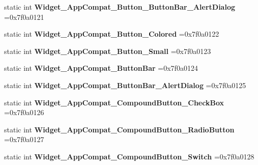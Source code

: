 \begin{DoxyCompactItemize}
static int {\bfseries Widget\+\_\+\+App\+Compat\+\_\+\+Button\+\_\+\+Button\+Bar\+\_\+\+Alert\+Dialog} =0x7f0a0121
\item 
\mbox{\label{classandroid_1_1support_1_1v7_1_1mediarouter_1_1R_1_1style_a526e5e9cd743dd54fc52c55bef9ba08b}} 
static int {\bfseries Widget\+\_\+\+App\+Compat\+\_\+\+Button\+\_\+\+Colored} =0x7f0a0122
\item 
\mbox{\label{classandroid_1_1support_1_1v7_1_1mediarouter_1_1R_1_1style_a2b6f6f9619f0bad1ce7cafd6d342f372}} 
static int {\bfseries Widget\+\_\+\+App\+Compat\+\_\+\+Button\+\_\+\+Small} =0x7f0a0123
\item 
\mbox{\label{classandroid_1_1support_1_1v7_1_1mediarouter_1_1R_1_1style_aa8c7c51e91608a7bd7e1ee62da226377}} 
static int {\bfseries Widget\+\_\+\+App\+Compat\+\_\+\+Button\+Bar} =0x7f0a0124
\item 
\mbox{\label{classandroid_1_1support_1_1v7_1_1mediarouter_1_1R_1_1style_a7a4b1e24713ee3e430383b3537585d3b}} 
static int {\bfseries Widget\+\_\+\+App\+Compat\+\_\+\+Button\+Bar\+\_\+\+Alert\+Dialog} =0x7f0a0125
\item 
\mbox{\label{classandroid_1_1support_1_1v7_1_1mediarouter_1_1R_1_1style_a9562b7ccd2f09486045d7deda4a21337}} 
static int {\bfseries Widget\+\_\+\+App\+Compat\+\_\+\+Compound\+Button\+\_\+\+Check\+Box} =0x7f0a0126
\item 
\mbox{\label{classandroid_1_1support_1_1v7_1_1mediarouter_1_1R_1_1style_a2371d3e19b15310b52014b4c10536bb6}} 
static int {\bfseries Widget\+\_\+\+App\+Compat\+\_\+\+Compound\+Button\+\_\+\+Radio\+Button} =0x7f0a0127
\item 
\mbox{\label{classandroid_1_1support_1_1v7_1_1mediarouter_1_1R_1_1style_aed2c8d77820ffeb91013a152bbe37e80}} 
static int {\bfseries Widget\+\_\+\+App\+Compat\+\_\+\+Compound\+Button\+\_\+\+Switch} =0x7f0a0128

\end{DoxyCompactItemize}
